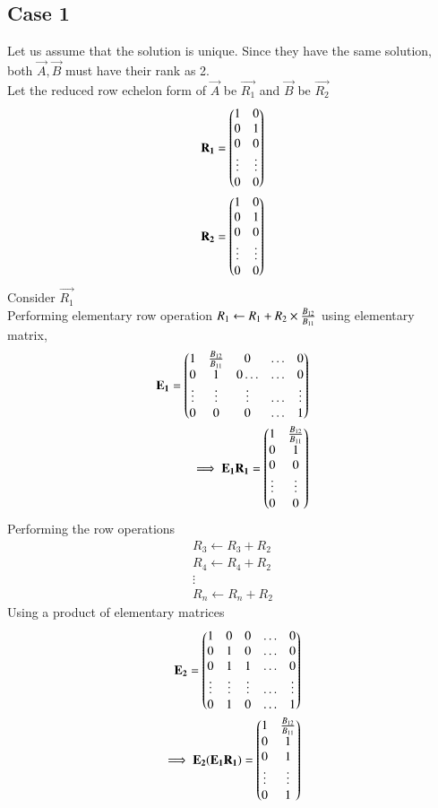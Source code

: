 \documentclass[journal,12pt,twocolumn]{IEEEtran}
\begin{document}
\subsection{Case 1}
Let us assume that the solution is unique.
Since they have the same solution, both $\vec{A},\vec{B}$ must have their rank as 2.\\
Let the reduced row echelon form of $\vec{A}$ be $\vec{R_1}$ and $\vec{B}$ be $\vec{R_2}$
\begin{align}
   \mathbf{R_1}= \begin{pmatrix}1&0\\0&1\\0&0\\ \vdots & \vdots \\0&0\end{pmatrix} \\
    \mathbf{R_2}= \begin{pmatrix}1&0\\0&1\\0&0\\ \vdots & \vdots \\0&0\end{pmatrix}
\end{align}
Consider $\vec{R_1}$\\
Performing elementary row operation $\\R_1\leftarrow R_1+R_2\times \frac{B_{12}}{B_{11}}\\$ using elementary matrix,
\begin{align}
    \mathbf{E_1}=\begin{pmatrix}1&\frac{B_{12}}{B_{11}}&0&\hdots&0\\0&1&0\hdots&\hdots&0\\\vdots&\vdots&\vdots&\hdots&\vdots\\0&0&0&\hdots&1\end{pmatrix}\\
   \implies \mathbf{E_1}\mathbf{R_1}=\begin{pmatrix}1&\frac{B_{12}}{B_{11}}\\0&1\\0&0\\ \vdots & \vdots \\0&0\end{pmatrix}
\end{align}
Performing the row operations
\begin{align}
  R_3\leftarrow R_3+R_2 \\
  R_4\leftarrow R_4+R_2\\
  \vdots\\
  R_n\leftarrow R_n+R_2
 \end{align}
 Using a product of elementary matrices
 \begin{align}
  \mathbf{E_2}=\begin{pmatrix}1&0&0&\hdots&0\\0&1&0&\hdots&0\\0&1&1&\hdots&0\\\vdots&\vdots&\vdots&\hdots&\vdots\\0&1&0&\hdots&1\end{pmatrix}\\
 \implies \mathbf{E_2}(\mathbf{E_1}\mathbf{R_1})=\begin{pmatrix}1&\frac{B_{12}}{B_{11}}\\0&1\\0&1\\ \vdots & \vdots \\0&1\end{pmatrix}
\end{align}
\end{document}
